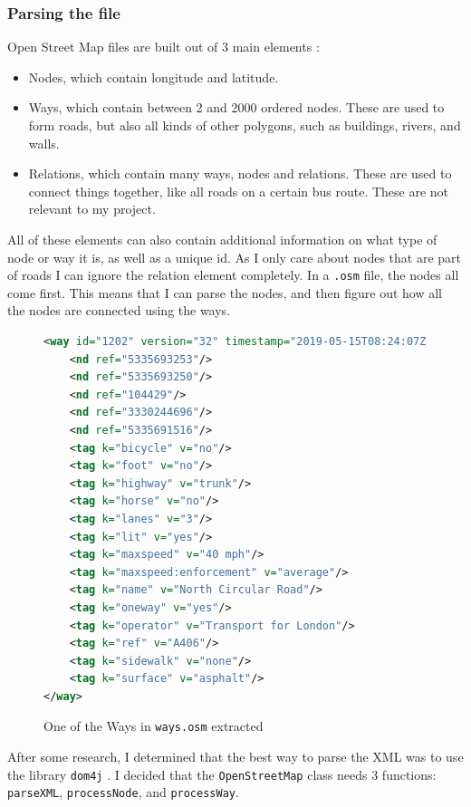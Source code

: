 \documentclass[11pt,twoside,a4paper]{report}
\begin{document}
\subsubsection{Parsing the file}
Open Street Map files are built out of 3 main elements \cite{osmwikipage}:
\begin{itemize}
    \item Nodes, which contain longitude and latitude. 
    \item Ways, which contain between 2 and 2000 ordered nodes. These are used to form roads, but also all kinds of other polygons, such as buildings, rivers, and walls. 
    \item Relations, which contain many ways, nodes and relations. These are used to connect things together, like all roads on a certain bus route. These are not relevant to my project.
\end{itemize}
All of these elements can also contain additional information on what type of node or way it is, as well as a unique id. 
As I only care about nodes that are part of roads I can ignore the relation element completely. In a \texttt{.osm} file, the nodes all come first. This means that I can parse the nodes, 
and then figure out how all the nodes are connected using the ways.\\
\begin{figure}[t]
    \begin{lstlisting}[language=XML]
<way id="1202" version="32" timestamp="2019-05-15T08:24:07Z" uid="7105697" user="_Garrison_" changeset="70264933">
    <nd ref="5335693253"/>
    <nd ref="5335693250"/>
    <nd ref="104429"/>
    <nd ref="3330244696"/>
    <nd ref="5335691516"/>
    <tag k="bicycle" v="no"/>
    <tag k="foot" v="no"/>
    <tag k="highway" v="trunk"/>
    <tag k="horse" v="no"/>
    <tag k="lanes" v="3"/>
    <tag k="lit" v="yes"/>
    <tag k="maxspeed" v="40 mph"/>
    <tag k="maxspeed:enforcement" v="average"/>
    <tag k="name" v="North Circular Road"/>
    <tag k="oneway" v="yes"/>
    <tag k="operator" v="Transport for London"/>
    <tag k="ref" v="A406"/>
    <tag k="sidewalk" v="none"/>
    <tag k="surface" v="asphalt"/>
</way>
\end{lstlisting}
\caption{One of the Ways in \texttt{ways.osm} extracted}
\label{North Circular}
\end{figure}
After some research, I determined that the best way to parse the XML was to use the library \texttt{dom4j} \cite{dom4jsite}. I decided that the \texttt{OpenStreetMap} class needs 3 functions: \texttt{parseXML}, \texttt{processNode}, and \texttt{processWay}.
\end{document}

